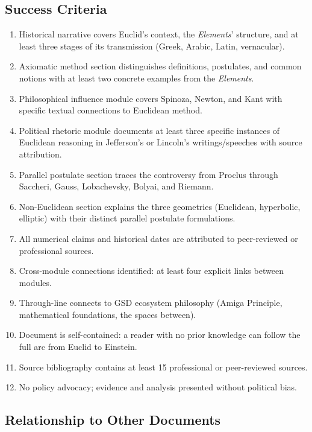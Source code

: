 \documentclass[11pt,letterpaper]{article}
\begin{document}
\subsection{Success Criteria}

\begin{enumerate}
  \item Historical narrative covers Euclid's context, the \textit{Elements}' structure, and at least three stages of its transmission (Greek, Arabic, Latin, vernacular).
  \item Axiomatic method section distinguishes definitions, postulates, and common notions with at least two concrete examples from the \textit{Elements}.
  \item Philosophical influence module covers Spinoza, Newton, and Kant with specific textual connections to Euclidean method.
  \item Political rhetoric module documents at least three specific instances of Euclidean reasoning in Jefferson's or Lincoln's writings/speeches with source attribution.
  \item Parallel postulate section traces the controversy from Proclus through Saccheri, Gauss, Lobachevsky, Bolyai, and Riemann.
  \item Non-Euclidean section explains the three geometries (Euclidean, hyperbolic, elliptic) with their distinct parallel postulate formulations.
  \item All numerical claims and historical dates are attributed to peer-reviewed or professional sources.
  \item Cross-module connections identified: at least four explicit links between modules.
  \item Through-line connects to GSD ecosystem philosophy (Amiga Principle, mathematical foundations, the spaces between).
  \item Document is self-contained: a reader with no prior knowledge can follow the full arc from Euclid to Einstein.
  \item Source bibliography contains at least 15 professional or peer-reviewed sources.
  \item No policy advocacy; evidence and analysis presented without political bias.
\end{enumerate}

\subsection{Relationship to Other Documents}
\end{document}
